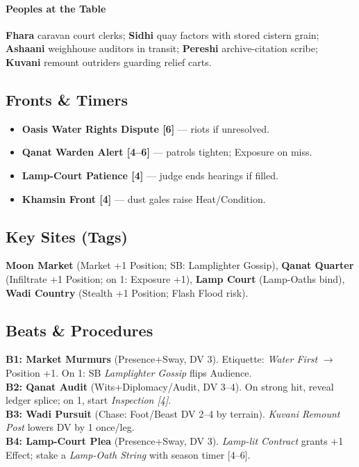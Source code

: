 \documentclass[11pt]{article}
\begin{document}
\paragraph{Peoples at the Table} 
\textbf{Fhara} caravan court clerks; \textbf{Sidhi} quay factors with stored cistern grain; \textbf{Ashaani} weighhouse auditors in transit; \textbf{Pereshi} archive-citation scribe; \textbf{Kuvani} remount outriders guarding relief carts.

\subsection*{Fronts \& Timers}
\begin{itemize}
  \item \textbf{Oasis Water Rights Dispute [6]} --- riots if unresolved.
  \item \textbf{Qanat Warden Alert [4--6]} --- patrols tighten; Exposure on miss.
  \item \textbf{Lamp-Court Patience [4]} --- judge ends hearings if filled.
  \item \textbf{Khamsin Front [4]} --- dust gales raise Heat/Condition.
\end{itemize}

\subsection*{Key Sites (Tags)}
\textbf{Moon Market} (Market +1 Position; SB: Lamplighter Gossip), 
\textbf{Qanat Quarter} (Infiltrate +1 Position; on 1: Exposure +1), 
\textbf{Lamp Court} (Lamp-Oaths bind), 
\textbf{Wadi Country} (Stealth +1 Position; Flash Flood risk).

\subsection*{Beats \& Procedures}
\textbf{B1: Market Murmurs} (Presence+Sway, DV 3). Etiquette: \emph{Water First} $\rightarrow$ Position +1. On 1: SB \emph{Lamplighter Gossip} flips Audience. \\
\textbf{B2: Qanat Audit} (Wits+Diplomacy/Audit, DV 3--4). On strong hit, reveal ledger splice; on 1, start \emph{Inspection [4]}. \\
\textbf{B3: Wadi Pursuit} (Chase: Foot/Beast DV 2--4 by terrain). \emph{Kuvani Remount Post} lowers DV by 1 once/leg. \\
\textbf{B4: Lamp-Court Plea} (Presence+Sway, DV 3). \emph{Lamp-lit Contract} grants +1 Effect; stake a \emph{Lamp-Oath String} with season timer [4--6].
\end{document}
